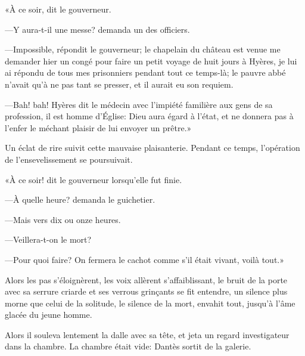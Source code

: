 «À ce soir, dit le gouverneur.

—Y aura-t-il une messe? demanda un des officiers.

—Impossible, répondit le gouverneur; le chapelain du château est venue me demander hier un congé pour faire un petit voyage de huit jours à Hyères, je lui ai répondu de tous mes prisonniers pendant tout ce temps-là; le pauvre abbé n'avait qu'à ne pas tant se presser, et il aurait eu son requiem.

—Bah! bah! Hyères dit le médecin avec l'impiété familière aux gens de sa profession, il est homme d'Église: Dieu aura égard à l'état, et ne donnera pas à l'enfer le méchant plaisir de lui envoyer un prêtre.»

Un éclat de rire suivit cette mauvaise plaisanterie. Pendant ce temps, l'opération de l'ensevelissement se poursuivait.

«À ce soir! dit le gouverneur lorsqu'elle fut finie.

—À quelle heure? demanda le guichetier.

—Mais vers dix ou onze heures.

—Veillera-t-on le mort?

—Pour quoi faire? On fermera le cachot comme s'il était vivant, voilà tout.»

Alors les pas s'éloignèrent, les voix allèrent s'affaiblissant, le bruit de la porte avec sa serrure criarde et ses verrous grinçants se fit entendre, un silence plus morne que celui de la solitude, le silence de la mort, envahit tout, jusqu'à l'âme glacée du jeune homme.

Alors il souleva lentement la dalle avec sa tête, et jeta un regard investigateur dans la chambre. La chambre était vide: Dantès sortit de la galerie.



